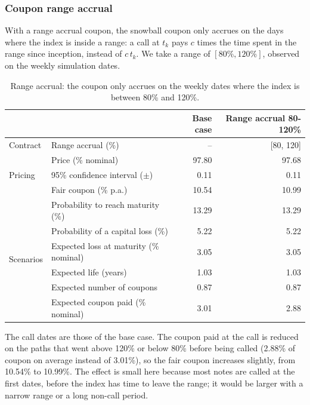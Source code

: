 \documentclass[11pt,a4paper]{article}
\begin{document}
\clearpage
\subsubsection{Coupon range accrual}

With a range accrual coupon, the snowball coupon only accrues on the days where the index is inside a range: a call
at $t_k$ pays $c$ times the time spent in the range since inception, instead of $c\,t_k$. We take a range of
$[80\%, 120\%]$, observed on the weekly simulation dates.

\begin{table}[htbp]
  \centering
  \small
  \begin{tabular}{llrr}
    \toprule
     & & \textbf{Base case} & \textbf{Range accrual 80-120\%} \\
    \midrule
    \multirow{1}{*}{Contract}
      & Range accrual (\%) & -- & [80, 120] \\
    \midrule
    \multirow{3}{*}{Pricing}
      & Price (\% nominal) & 97.80 & 97.68 \\
      & 95\% confidence interval ($\pm$) & 0.11 & 0.11 \\
      & Fair coupon (\% p.a.) & 10.54 & 10.99 \\
    \midrule
    \multirow{6}{*}{Scenarios}
      & Probability to reach maturity (\%) & 13.29 & 13.29 \\
      & Probability of a capital loss (\%) & 5.22 & 5.22 \\
      & Expected loss at maturity (\% nominal) & 3.05 & 3.05 \\
      & Expected life (years) & 1.03 & 1.03 \\
      & Expected number of coupons & 0.87 & 0.87 \\
      & Expected coupon paid (\% nominal) & 3.01 & 2.88 \\
    \bottomrule
  \end{tabular}
  \caption{Range accrual: the coupon only accrues on the weekly dates where the index is between 80\% and 120\%.}
  \label{tab:athena-range}
\end{table}

The call dates are those of the base case. The coupon paid at the call is reduced on the paths that went above 120\%
or below 80\% before being called (2.88\% of coupon on average instead of 3.01\%), so the fair coupon increases
slightly, from 10.54\% to 10.99\%. The effect is small here because most notes are called at the first dates, before
the index has time to leave the range; it would be larger with a narrow range or a long non-call period.
\end{document}
